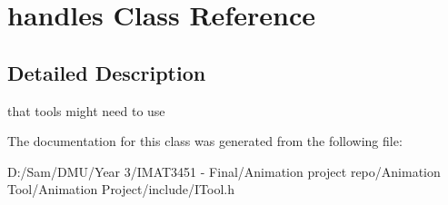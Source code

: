 \hypertarget{classhandles}{}\section{handles Class Reference}
\label{classhandles}


\subsection{Detailed Description}
that tools might need to use 

The documentation for this class was generated from the following file\+:\begin{DoxyCompactItemize}
\item 
D\+:/\+Sam/\+D\+M\+U/\+Year 3/\+I\+M\+A\+T3451 -\/ Final/\+Animation project repo/\+Animation Tool/\+Animation Project/include/I\+Tool.\+h\end{DoxyCompactItemize}
